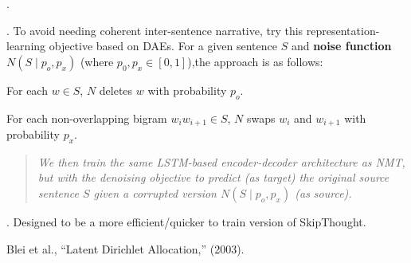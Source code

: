 \documentclass[11pt]{article}
\newcommand\myspace[1][]{\vspace{#1\bigskipamount}}
\newcommand\p{\Needspace{10\baselineskip} \noindent}
\begin{document}
\myspace
\p {}. 
\begin{compactitem}
	\item {}. To avoid needing coherent inter-sentence narrative, try this representation-learning objective based on DAEs. For a given sentence $S$ and \textbf{noise function} $N(S \mid p_o, p_x)$ (where $p_0, p_x \in [0, 1]$),the approach is as follows:
	\begin{compactenum}
		\item For each $w \in S$, $N$ deletes $w$ with probability $p_o$.
		\item For each non-overlapping bigram $w_iw_{i + 1} \in S$, $N$ swaps $w_i$ and $w_{i + 1}$ with probability $p_x$.
	\end{compactenum}
	\begin{quote}
		{\footnotesize \textit{
				We then train the same LSTM-based encoder-decoder architecture as NMT, but with the denoising objective to predict (as target) the original source sentence $S$ given a corrupted version $N(S \mid p_o, p_x)$ (as source).
				}}
	\end{quote}
	
	\item {}. Designed to be a more efficient/quicker to train version of SkipThought.
\end{compactitem}





\vspace{-1em}
{\footnotesize Blei et al., ``Latent Dirichlet Allocation,'' (2003).}
\end{document}
